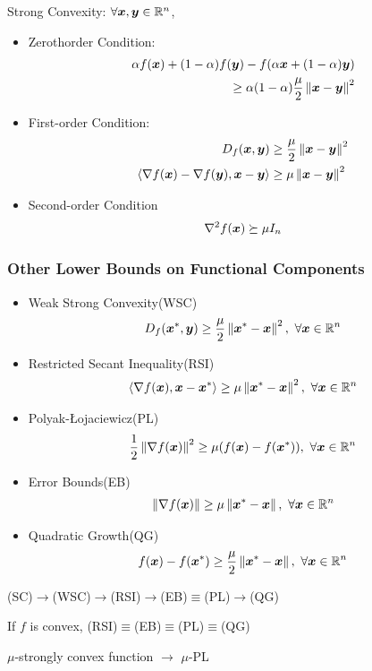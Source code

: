 Strong Convexity: $\forall \bm{x},\bm{y}\in\mathbb{R}^n$,
\begin{itemize}
    \item Zerothorder Condition:
    \begin{align*}
        \alpha f(\bm{x})+(1-\alpha)f(\bm{y})-f(\alpha \bm{x}+(1-\alpha)\bm{y})\\
        \ge \alpha(1-\alpha)\frac{\mu}{2}\left\lVert\bm{x}-\bm{y}\right\rVert^2
    \end{align*}
    \item First-order Condition:
    \begin{align*}
        D_f(\bm{x},\bm{y}) &\ge \frac{\mu}{2}\left\lVert\bm{x}-\bm{y}\right\rVert^2\\
        \braket{\nabla f(\bm{x})-\nabla f(\bm{y}),\bm{x}-\bm{y}}&\ge \mu\left\lVert\bm{x}-\bm{y}\right\rVert^2
    \end{align*}
    \item Second-order Condition
    \begin{align*}
        \nabla ^2 f(\bm{x})\succeq \mu I_n
    \end{align*}
\end{itemize}

\subsubsection{Other Lower Bounds on Functional Components}
\begin{itemize}
    \item Weak Strong Convexity(WSC) 
    \begin{align*}
        D_f(\bm{x}^*,\bm{y})\ge \frac{\mu}{2}\left\lVert\bm{x}^*-\bm{x}\right\rVert^2,\ \forall \bm{x}\in\mathbb{R}^n
    \end{align*}
    \item Restricted Secant Inequality(RSI)
    \begin{align*}
        \braket{\nabla f(\bx), \bx-\bx^*}\ge \mu\norm{\bx^*-\bx}^2,\ \forall \bx\in\R^n
    \end{align*}
    \item Polyak-Łojaciewicz(PL) 
    \begin{align*}
        \frac{1}{2}\norm{\nabla f(\bx)}^2\ge \mu (f(\bx)-f(\bx^*)),\ \forall \bx\in\R^n
    \end{align*}
    \item Error Bounds(EB)
    \begin{align*}
        \left\lVert\nabla f(\bm{x})\right\rVert\ge \mu \left\lVert\bm{x}^*-\bm{x}\right\rVert,\ \forall \bm{x}\in\mathbb{R}^n
    \end{align*}
    \item Quadratic Growth(QG)
    \begin{align*}
        f(\bm{x})-f(\bm{x}^*)\ge \frac{\mu}{2}\left\lVert\bm{x}^*-\bm{x}\right\rVert,\ \forall \bm{x}\in\mathbb{R}^n
    \end{align*}
\end{itemize}

(SC)$\to$(WSC)$\to$(RSI)$\to$(EB)$\equiv$(PL)$\to$(QG)

If $f$ is convex, (RSI)$\equiv$(EB)$\equiv$(PL)$\equiv$(QG)

\begin{theorem}
    $\mu$-strongly convex function $\to$ $\mu$-PL
\end{theorem}